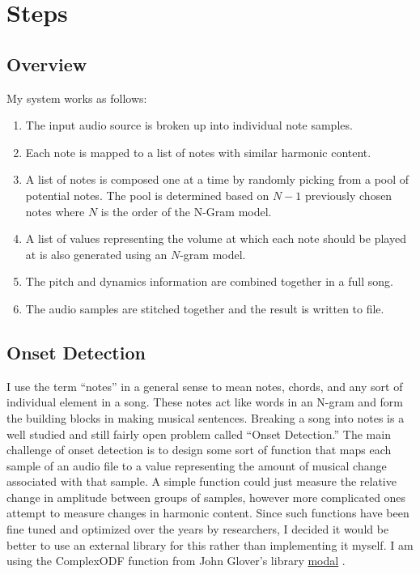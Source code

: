 \documentclass{amsart}
\theoremstyle{definition}
\begin{document}

\newpage

\section{Steps}

\subsection{Overview}

My system works as follows:
\begin{enumerate}[label=\arabic*.]
  \item
    The input audio source is broken up into individual note samples.
  \item
    Each note is mapped to a list of notes with similar harmonic content.
  \item
    A list of notes is composed one at a time by randomly picking from a pool of potential notes. 
    The pool is determined based on $N-1$ previously chosen notes where $N$ is the order of the N-Gram model.
  \item
    A list of values representing the volume at which each note should be played at is also generated using an $N$-gram model.
  \item
    The pitch and dynamics information are combined together in a full song.
  \item
    The audio samples are stitched together
    and the result is written to file.
\end{enumerate}

\subsection{Onset Detection}

I use the term ``notes'' in a general sense to mean notes, chords, and any sort of individual element in a song.
These notes act like words in an N-gram and form the building blocks in making musical sentences.
Breaking a song into notes is a well studied and still fairly open problem called ``Onset Detection.''
The main challenge of onset detection is to design some sort of function that maps each sample of an audio file
to a value representing the amount of musical change associated with that sample.
A simple function could just measure the relative change in amplitude between groups of samples, 
however more complicated ones attempt to measure changes in harmonic content.
Since such functions have been fine tuned and optimized over the years by researchers,
I decided it would be better to use an external library for this rather than implementing it myself.
I am using the {\sc ComplexODF} function from John Glover's library 
\href{https://github.com/johnglover/modal}{modal}
\cite{modal}.
\end{document}
